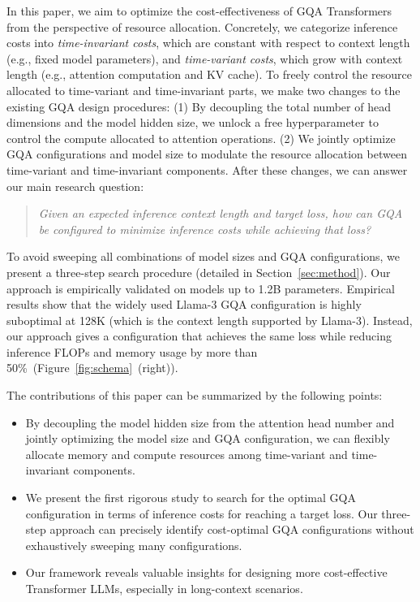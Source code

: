 \documentclass[11pt]{article}
\begin{document}
In this paper, we aim to optimize the cost-effectiveness of GQA Transformers from the perspective of resource allocation. Concretely, we categorize inference costs into \textit{time-invariant costs}, which are constant with respect to context length (e.g., fixed model parameters), and \textit{time-variant costs}, which grow with context length (e.g., attention computation and KV cache).
To freely control the resource allocated to time-variant and time-invariant parts, we make two changes to the existing GQA design procedures: (1) By decoupling the total number of head dimensions and the model hidden size, we unlock a free hyperparameter to control the compute allocated to attention operations. (2) We jointly optimize GQA configurations and model size to modulate the resource allocation between time-variant and time-invariant components. 
After these changes, we can answer our main research question:
\begin{quote}
    \textit{Given an expected inference context length and target loss, how can GQA be configured to minimize inference costs while achieving that loss?}
\end{quote}
To avoid sweeping all combinations of model sizes and GQA configurations, we present a three-step search procedure (detailed in Section~\ref{sec:method}). Our approach is empirically validated on models up to 1.2B parameters. Empirical results show that the widely used Llama-3 GQA configuration \citep{llama3} is highly suboptimal at 128K (which is the context length supported by Llama-3). Instead, our approach gives a configuration that achieves the same loss while reducing inference FLOPs and memory usage by more than 50\%~(Figure~\ref{fig:schema}~(right)).


The contributions of this paper can be summarized by the following points:

\begin{itemize}
    \item By decoupling the model hidden size from the attention head number and jointly optimizing the model size and GQA configuration, we can flexibly allocate memory and compute resources among time-variant and time-invariant components.
    \item We present the first rigorous study to search for the optimal GQA configuration in terms of inference costs for reaching a target loss. Our three-step approach can precisely identify cost-optimal GQA configurations without exhaustively sweeping many configurations.
    \item Our framework reveals valuable insights for designing more cost-effective Transformer LLMs, especially in long-context scenarios.
\end{itemize}
\end{document}
